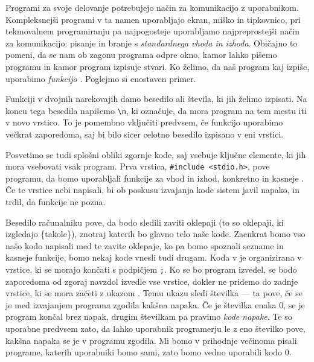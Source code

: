 
Programi za svoje delovanje potrebujejo način za komunikacijo z uporabnikom.
Kompleksnejši programi v ta namen uporabljajo ekran, miško in tipkovnico, pri
tekmovalnem programiranju pa najpogosteje uporabljamo najpreprostejši način za
komunikacijo: pisanje in branje s \emph{standardnega vhoda in izhoda}.
Običajno to pomeni, da se nam ob zagonu programa odpre okno, kamor lahko pišemo
programu in kamor program izpisuje stvari.
Ko želimo, da naš program kaj izpiše, uporabimo \emph{funkcijo} .
Poglejmo si enostaven primer.


Funkciji  v dvojnih narekovajih damo besedilo ali števila, ki jih
želimo izpisati.
Na koncu tega besedila napišemo \verb+\n+, ki označuje, da mora program na tem
mestu iti v novo vrstico.
To je pomembno vključiti predvsem, če funkcijo  uporabimo večkrat
zaporedoma, saj bi bilo sicer celotno besedilo izpisano v eni vrstici.

Posvetimo se tudi splošni obliki zgornje kode, saj vsebuje ključne elemente, ki
jih mora vsebovati vsak program.
Prva vrstica, \verb+#include <stdio.h>+, pove programu, da bomo uporabljali
funkcije za vhod in izhod, konkretno  in kasneje .
Če te vrstice nebi napisali, bi ob poskusu izvajanja kode sistem javil napako,
in trdil, da funkcije  ne pozna.

Besedilo  računalniku pove, da bodo sledili zaviti oklepaji (to
so oklepaji, ki izgledajo \{takole\}), znotraj katerih bo glavno telo naše kode.
Zaenkrat bomo vso našo kodo napisali med te zavite oklepaje, ko pa bomo spoznali
sezname in kasneje funkcije, bomo nekaj kode vnesli tudi drugam.
Koda v  je organizirana v vrstice, ki se morajo končati s podpičjem
\verb+;+.
Ko se bo program izvedel, se bodo zaporedoma od zgoraj navzdol izvedle vse
vrstice, dokler ne pridemo do zadnje vrstice, ki se mora začeti z ukazom
.
Temu ukazu sledi številka --- ta pove, če se je med izvajanjem programa zgodila
kakšna napaka.
Če je številka enaka $0$, se je program končal brez napak, drugim številkam pa
pravimo \emph{kode napake}.
Te so uporabne predvsem zato, da lahko uporabnik programerju le z eno številko
pove, kakšna napaka se je v programu zgodila.
Mi bomo v prihodnje večinoma pisali programe, katerih uporabniki bomo sami, zato
bomo vedno uporabili kodo $0$.

